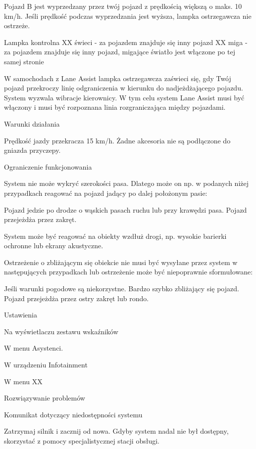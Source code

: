 Pojazd B jest wyprzedzany przez twój pojazd z prędkością większą o maks. 10 km/h. Jeśli prędkość podczas wyprzedzania jest wyższa, lampka ostrzegawcza nie ostrzeże.

Lampka kontrolna
XX świeci - za pojazdem znajduje się inny pojazd
XX miga - za pojazdem znajduje się inny pojazd, migające światło jest włączone po tej samej stronie

W samochodach z Lane Assist lampka ostrzegawcza zaświeci się, gdy Twój pojazd przekroczy linię odgraniczenia w kierunku do nadjeżdżającego pojazdu.
System wyzwala wibracje kierownicy.
W tym celu system Lane Assist musi być włączony i musi być rozpoznana linia rozgraniczająca między pojazdami.

Warunki działania
\begin{itemizeTick}
	\itemTick Prędkość jazdy przekracza 15 km/h.
	\itemTick Żadne akcesoria nie są podłączone do gniazda przyczepy.
\end{itemizeTick}

Ograniczenie funkcjonowania

System nie może wykryć szerokości pasa. Dlatego może on np. w podanych niżej przypadkach reagować na pojazd jadący po dalej położonym pasie:
\begin{itemizeTriangle}
	\itemTriangle Pojazd jedzie po drodze o wąskich pasach ruchu lub przy krawędzi pasa.
	\itemTriangle Pojazd przejeżdża przez zakręt.
\end{itemizeTriangle}
System może być reagować na obiekty wzdłuż drogi, np. wysokie barierki ochronne lub ekrany akustyczne.

Ostrzeżenie o zbliżającym się obiekcie nie musi być wysyłane przez system w następujących przypadkach lub ostrzeżenie może być niepoprawnie sformułowane:
\begin{itemizeTriangle}
	\itemTriangle Jeśli warunki pogodowe są niekorzystne.
	\itemTriangle Bardzo szybko zbliżający się pojazd.
	\itemTriangle Pojazd przejeżdża przez ostry zakręt lub rondo.
\end{itemizeTriangle}

Ustawienia

Na wyświetlaczu zestawu wskaźników

W menu Asystenci.

W urządzeniu Infotainment

W menu XX

Rozwiązywanie problemów

Komunikat dotyczący niedostępności systemu
\begin{itemizeArrow}
	\itemArrow Zatrzymaj silnik i zacznij od nowa.
	\itemArrow Gdyby system nadal nie był dostępny, skorzystać z pomocy specjalistycznej stacji obsługi.
\end{itemizeArrow}

